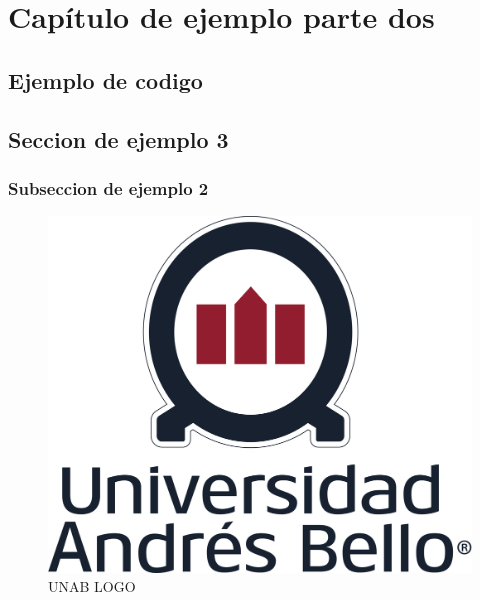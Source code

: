 
\titleformat{\chapter}[display]
    {\normalfont\Large\bfseries}{\filleft\chaptertitlename\ \thechapter}{20pt}{\Huge}
\chapter{Capítulo de ejemplo parte dos}
\justify
\lipsum[1-3]
\section{Ejemplo de codigo}
    \lipsum[1-2] \cite{Github}
    
   \lipsum[1]
\section{Seccion de ejemplo 3}
    \lipsum[1]
    \subsection{Subseccion de ejemplo 2}
        \lipsum[1]
        \newline
        \begin{figure}[ht]
            \centering
            \includegraphics[scale=1]{imgs/unabLogos/unabFrontPageLogo.png} 
            \caption{UNAB LOGO}
        \end{figure}
        \newline
       
